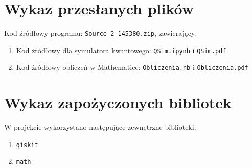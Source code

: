 \documentclass{article}
\begin{document}
\section{Wykaz przesłanych plików}
    Kod źródłowy programu: \verb+Source_2_145380.zip+, zawierający:
    \begin{enumerate}
        \item Kod źródłowy dla symulatora kwantowego: \verb+QSim.ipynb+ i \verb+QSim.pdf+
        \item Kod źródłowy obliczeń w Mathematice: \verb+Obliczenia.nb+ i \verb+Obliczenia.pdf+
        
    \end{enumerate}
\section{Wykaz zapożyczonych bibliotek}
W projekcie wykorzystano następujące zewnętrzne biblioteki:
    \begin{enumerate}
        \item \verb+qiskit+
        \item \verb+math+
    \end{enumerate}
\end{document}
